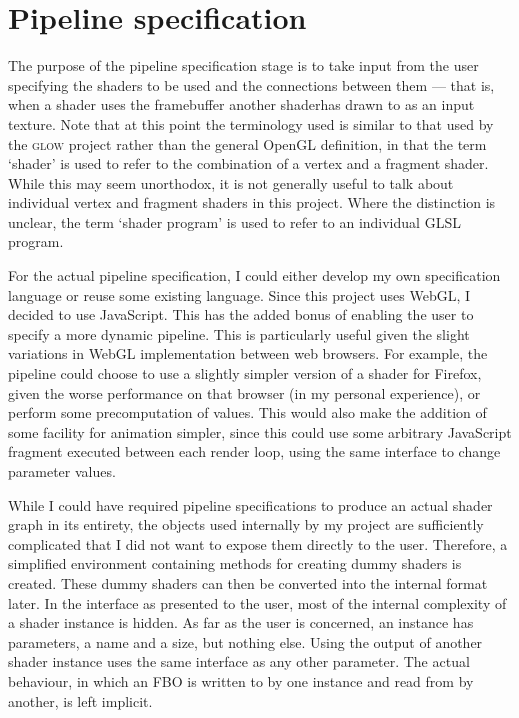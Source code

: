 \documentclass[12pt,twoside,notitlepage]{report}
\begin{document}
\clearpage
\section{Pipeline specification}
The purpose of the pipeline specification stage is to take input from the user specifying the shaders to be used and the connections between them --- that is, when a shader uses the framebuffer another shaderhas drawn to as an input texture. Note that at this point the terminology used is similar to that used by the \textsc{glow} project rather than the general OpenGL definition, in that the term `shader' is used to refer to the combination of a vertex and a fragment shader. While this may seem unorthodox, it is not generally useful to talk about individual vertex and fragment shaders in this project. Where the distinction is unclear, the term `shader program' is used to refer to an individual GLSL program.

For the actual pipeline specification, I could either develop my own specification language or reuse some existing language. Since this project uses WebGL, I decided to use JavaScript. This has the added bonus of enabling the user to specify a more dynamic pipeline. This is particularly useful given the slight variations in WebGL implementation between web browsers. For example, the pipeline could choose to use a slightly simpler version of a shader for Firefox, given the worse performance on that browser (in my personal experience), or perform some precomputation of values. This would also make the addition of some facility for animation simpler, since this could use some arbitrary JavaScript fragment executed between each render loop, using the same interface to change parameter values.

While I could have required pipeline specifications to produce an actual shader graph in its entirety, the objects used internally by my project are sufficiently complicated that I did not want to expose them directly to the user. Therefore, a simplified environment containing methods for creating dummy shaders is created. These dummy shaders can then be converted into the internal format later. In the interface as presented to the user, most of the internal complexity of a shader instance is hidden. As far as the user is concerned, an instance has parameters, a name and a size, but nothing else. Using the output of another shader instance uses the same interface as any other parameter. The actual behaviour, in which an FBO is written to by one instance and read from by another, is left implicit.
\end{document}
